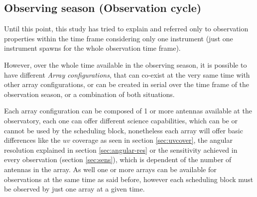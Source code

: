\subsection{Observing season (Observation cycle)}
Until this point, this study has tried to explain and referred only to observation properties within the time frame considering only one instrument (just one instrument spawns for the whole observation time frame). 

However, over the whole time available in the observing season, it is possible to have different \textit{Array configurations}, that can co-exist at the very same time with other array configurations, or can be created in serial over the time frame of the observation season, or a combination of both situations.

Each array configuration can be composed of 1 or more antennas available at the observatory, each one can offer different science capabilities, which can be or cannot be used by the scheduling block, nonetheless each array will offer basic differences like the $uv$ coverage as seen in section \ref{sec:uvcover}, the angular resolution explained in section \ref{sec:angular-res} or the sensitivity achieved in every observation (section \ref{sec:sens}), which is dependent of the number of antennas in the array. As well one or more arrays can be available for observations at the same time as said before, however each scheduling block must be observed by just one array at a given time.

